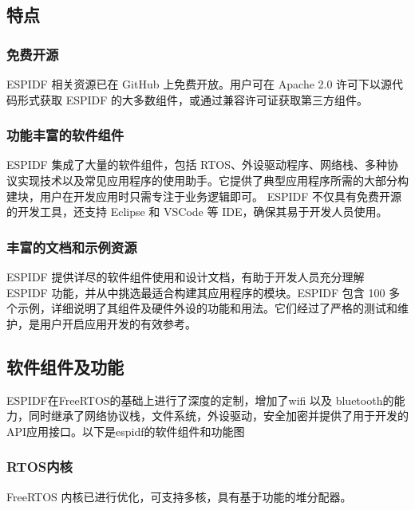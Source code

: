 \documentclass[a4paper,12pt,english]{sphinxmanual}
\begin{document}
\subsection{特点}
\label{\detokenize{dev-board/esp-idf:id1}}

\subsubsection{免费开源}
\label{\detokenize{dev-board/esp-idf:id2}}
\sphinxAtStartPar
ESP\sphinxhyphen{}IDF 相关资源已在 GitHub 上免费开放。用户可在 Apache 2.0 许可下以源代码形式获取 ESP\sphinxhyphen{}IDF 的大多数组件，或通过兼容许可证获取第三方组件。


\subsubsection{功能丰富的软件组件}
\label{\detokenize{dev-board/esp-idf:id3}}
\sphinxAtStartPar
ESP\sphinxhyphen{}IDF 集成了大量的软件组件，包括 RTOS、外设驱动程序、网络栈、多种协议实现技术以及常见应用程序的使用助手。它提供了典型应用程序所需的大部分构建块，用户在开发应用时只需专注于业务逻辑即可。 ESP\sphinxhyphen{}IDF 不仅具有免费开源的开发工具，还支持 Eclipse 和 VSCode 等 IDE，确保其易于开发人员使用。


\subsubsection{丰富的文档和示例资源}
\label{\detokenize{dev-board/esp-idf:id4}}
\sphinxAtStartPar
ESP\sphinxhyphen{}IDF 提供详尽的软件组件使用和设计文档，有助于开发人员充分理解 ESP\sphinxhyphen{}IDF 功能，并从中挑选最适合构建其应用程序的模块。ESP\sphinxhyphen{}IDF 包含 100 多个示例，详细说明了其组件及硬件外设的功能和用法。它们经过了严格的测试和维护，是用户开启应用开发的有效参考。


\subsection{软件组件及功能}
\label{\detokenize{dev-board/esp-idf:id5}}
\sphinxAtStartPar
ESP\sphinxhyphen{}IDF在FreeRTOS的基础上进行了深度的定制，增加了wifi 以及 bluetooth的能力，同时继承了网络协议栈，文件系统，外设驱动，安全加密并提供了用于开发的API应用接口。以下是esp\sphinxhyphen{}idf的软件组件和功能图

\sphinxAtStartPar
{}


\subsubsection{RTOS内核}
\label{\detokenize{dev-board/esp-idf:rtos}}
\sphinxAtStartPar
FreeRTOS 内核已进行优化，可支持多核，具有基于功能的堆分配器。
\end{document}
